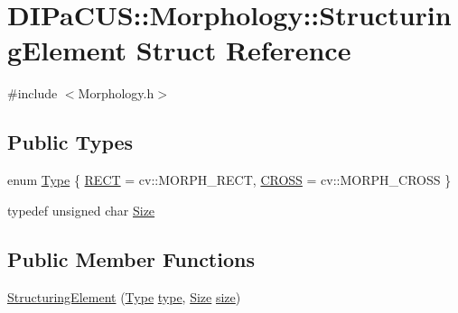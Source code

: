 \hypertarget{structDIPaCUS_1_1Morphology_1_1StructuringElement}{}\section{D\+I\+Pa\+C\+US\+:\+:Morphology\+:\+:Structuring\+Element Struct Reference}
\label{structDIPaCUS_1_1Morphology_1_1StructuringElement}


{\ttfamily \#include $<$Morphology.\+h$>$}

\subsection*{Public Types}
\begin{DoxyCompactItemize}
\item 
enum \hyperlink{structDIPaCUS_1_1Morphology_1_1StructuringElement_a266d1fadc80f8b6ead0b9a38046db1a9}{Type} \{ \hyperlink{structDIPaCUS_1_1Morphology_1_1StructuringElement_a266d1fadc80f8b6ead0b9a38046db1a9a7d76512707b30d60a60d7a4e4aebab6b}{R\+E\+CT} = cv\+:\+:M\+O\+R\+P\+H\+\_\+\+R\+E\+CT, 
\hyperlink{structDIPaCUS_1_1Morphology_1_1StructuringElement_a266d1fadc80f8b6ead0b9a38046db1a9aa3ab6a623692ce64ea4c9abe4dfb0844}{C\+R\+O\+SS} = cv\+:\+:M\+O\+R\+P\+H\+\_\+\+C\+R\+O\+SS
 \}
\item 
typedef unsigned char \hyperlink{structDIPaCUS_1_1Morphology_1_1StructuringElement_ab516593fb61afbb06be48f756af85b56}{Size}
\end{DoxyCompactItemize}
\subsection*{Public Member Functions}
\begin{DoxyCompactItemize}
\item 
\hyperlink{structDIPaCUS_1_1Morphology_1_1StructuringElement_a0b76aaa0928ac88005e6168270170db2}{Structuring\+Element} (\hyperlink{structDIPaCUS_1_1Morphology_1_1StructuringElement_a266d1fadc80f8b6ead0b9a38046db1a9}{Type} \hyperlink{structDIPaCUS_1_1Morphology_1_1StructuringElement_aea9961571fdde31c048b2b1bd59f296a}{type}, \hyperlink{structDIPaCUS_1_1Morphology_1_1StructuringElement_ab516593fb61afbb06be48f756af85b56}{Size} \hyperlink{structDIPaCUS_1_1Morphology_1_1StructuringElement_ade1c5c9095630d3f404a75b97f1ae825}{size})
\end{DoxyCompactItemize}
